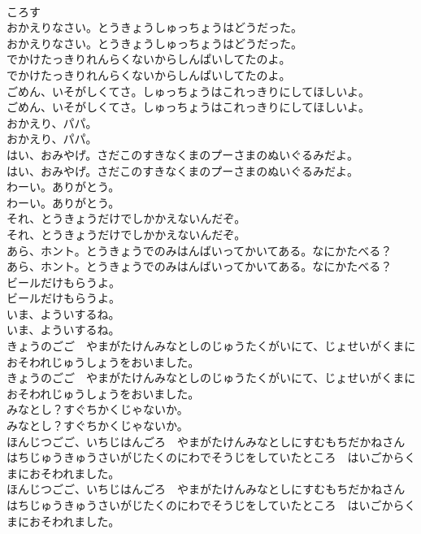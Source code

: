 \documentclass[8pt]{extreport}
\begin{document}
\begin{CJK}{UTF8}{min}
\\	ころす
\\	おかえりなさい。とうきょうしゅっちょうはどうだった。
\\	おかえりなさい。とうきょうしゅっちょうはどうだった。
\\	でかけたっきりれんらくないからしんぱいしてたのよ。
\\	でかけたっきりれんらくないからしんぱいしてたのよ。
\\	ごめん、いそがしくてさ。しゅっちょうはこれっきりにしてほしいよ。
\\	ごめん、いそがしくてさ。しゅっちょうはこれっきりにしてほしいよ。
\\	おかえり、パパ。
\\	おかえり、パパ。
\\	はい、おみやげ。さだこのすきなくまのプーさまのぬいぐるみだよ。
\\	はい、おみやげ。さだこのすきなくまのプーさまのぬいぐるみだよ。
\\	わーい。ありがとう。
\\	わーい。ありがとう。
\\	それ、とうきょうだけでしかかえないんだぞ。
\\	それ、とうきょうだけでしかかえないんだぞ。
\\	あら、ホント。とうきょうでのみはんばいってかいてある。なにかたべる？
\\	あら、ホント。とうきょうでのみはんばいってかいてある。なにかたべる？
\\	ビールだけもらうよ。
\\	ビールだけもらうよ。
\\	いま、よういするね。
\\	いま、よういするね。
\\	きょうのごご　やまがたけんみなとしのじゅうたくがいにて、じょせいがくまにおそわれじゅうしょうをおいました。
\\	きょうのごご　やまがたけんみなとしのじゅうたくがいにて、じょせいがくまにおそわれじゅうしょうをおいました。
\\	みなとし？すぐちかくじゃないか。
\\	みなとし？すぐちかくじゃないか。
\\	ほんじつごご、いちじはんごろ　やまがたけんみなとしにすむもちだかねさんはちじゅうきゅうさいがじたくのにわでそうじをしていたところ　はいごからくまにおそわれました。
\\	ほんじつごご、いちじはんごろ　やまがたけんみなとしにすむもちだかねさんはちじゅうきゅうさいがじたくのにわでそうじをしていたところ　はいごからくまにおそわれました。

\end{CJK}
\end{document}
